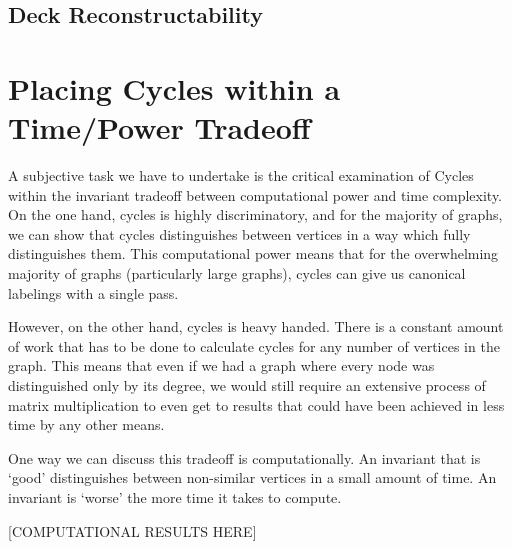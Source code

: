\subsection{Deck Reconstructability}

\section{Placing Cycles within a Time/Power Tradeoff}
A subjective task we have to undertake is the critical examination of Cycles within the invariant tradeoff between computational power and time complexity.
On the one hand, cycles is highly discriminatory, and for the majority of graphs, we can show that cycles distinguishes between vertices in a way which fully distinguishes them.
This computational power means that for the overwhelming majority of graphs (particularly large graphs), cycles can give us canonical labelings with a single pass.

However, on the other hand, cycles is heavy handed. There is a constant amount of work that has to be done to calculate cycles for any number of vertices in the graph. 
This means that even if we had a graph where every node was distinguished only by its degree, we would still require an extensive process of matrix multiplication to even get to results that could have been achieved in less time by any other means.

One way we can discuss this tradeoff is computationally.
An invariant that is `good' distinguishes between non-similar vertices in a small amount of time.
An invariant is `worse' the more time it takes to compute.

[COMPUTATIONAL RESULTS HERE] 

